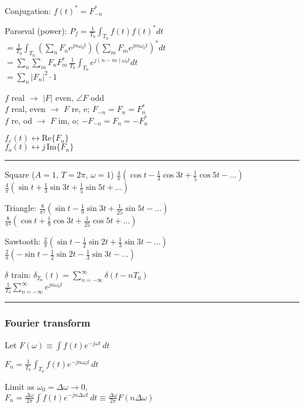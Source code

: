 \documentclass[4pt]{article}
\theoremstyle{definition}
\theoremstyle{definition}
\renewcommand{\o}{\omega}
\newcommand{\ra}{\rightarrow}
\newcommand{\lra}{\leftrightarrow}
\begin{document}
    Conjugation: $f(t)^* = F^*_{-n}$

    Parseval (power): \(P_f = \frac 1{T_0}\int_{T_0} f(t) f(t)^* dt\)\\
    \(=\frac{1}{T_0}\int_{T_0} (\sum_n F_n e^{jn\o_0t})(\sum_m F_m e^{jm\o_0t})^* dt\)\\
    \(=\sum_n \sum_m  F_n F_m^* \, \frac{1}{T_0}\int_{T_0} e^{j(n-m)\o_0t} dt\)\\
    \(=\sum_n |F_n|^2 \cdot 1\)

        $f$ real $\ra$ $|F|$ even, $\angle F$ odd\\
        $f$ real, even $\ra$ $F$ re, e; $F_{-n} = F_n = F_n^*$\\
        $f$ re, od $\ra$ $F$ im, o; $-F_{-n} = F_n = -F_n^*$

        $f_e(t) \lra \mathrm{Re}\{ F_n\}$\\
        $f_o(t) \lra j \,\mathrm{Im} \{F_n\}$
\rule{\linewidth}{0.5pt}
    Square ($A=1$, $T=2\pi$, $\omega = 1$) 
        $\frac{4}{\pi}(\cos t - \frac{1}{3}\cos 3t + \frac{1}{5} \cos 5t- ...)$\\
        $\frac{4}{\pi}(\sin t + \frac 1 3 \sin 3t + \frac 1 5 \sin 5t + ...)$

    Triangle: 
        $\frac{8}{\pi^2}(\sin t - \frac{1}{9} \sin 3t + \frac{1}{25} \sin 5t - ...)$\\
        $\frac{8}{\pi^2}(\cos t + \frac 1 9 \cos 3t + \frac 1 {25} \cos 5t + ...)$

    Sawtooth:   
        $\frac 2{\pi} (\sin t - \frac{1}{2} \sin 2t + \frac{1}{3} \sin 3t - ...)$\\
        $\frac 2{\pi} (-\sin t - \frac{1}{2} \sin 2t - \frac{1}{3} \sin 3t - ...)$

    $\delta$ train:     
        $\delta_{T_0} (t) = \sum_{n=-\infty}^{\infty} \delta(t - nT_0)$ \\
        $\frac{1}{T_0} \sum_{n=-\infty}^{\infty} e^{jn\omega_0 t}$

\rule{\linewidth}{0.5pt}
\newline
\subsubsection{Fourier transform}
    Let \(F(\omega) \equiv \int f(t) e^{-j\omega t} \, dt\)

    \(F_n = \frac 1 {T_0} \int_{T_0} f(t) e^{-jn\omega_0 t} \, dt\)

    Limit as $\omega_0 =\Delta\omega \ra 0$,\\
    \(F_n = \frac {\Delta\omega}{2\pi} \int f(t) e^{-jn\Delta\omega t} \, dt
    \equiv \frac{\Delta\omega}{2\pi} F(n\Delta\omega)\) %
\end{document}
